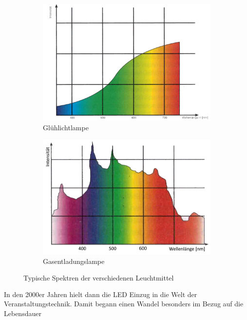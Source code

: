 \documentclass[11pt]{scrartcl}
\begin{document}
\begin{figure}[H]
    \centering
    \begin{subfigure}[b]{0.49\textwidth}
        \includegraphics[width=\textwidth]{images/conventional_spectrum.png}
        \caption{Glühlichtlampe}
    \end{subfigure}
    \hfill 
    \begin{subfigure}[b]{0.49\textwidth}
        \includegraphics[width=\textwidth]{images/HMI_Spectrum.png}
        \caption{Gasentladungslampe}
    \end{subfigure}
    \caption{Typische Spektren der verschiedenen Leuchtmittel \cite{showlicht}}\label{fig:lightEmiiterSpects}
\end{figure}
\noindent
In den 2000er Jahren hielt dann die LED Einzug in die Welt der Veranstaltungstechnik. Damit begann einen Wandel besonders im Bezug auf die Lebensdauer
\end{document}
